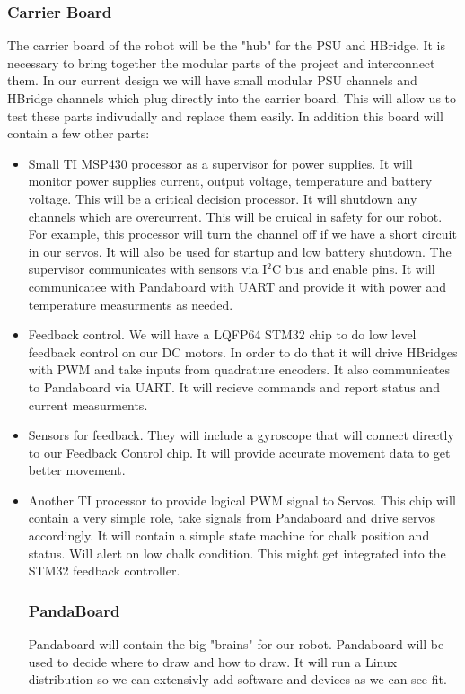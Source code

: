 \documentclass[12pt]{article}
\begin{document}
     \subsubsection{Carrier Board}
     The carrier board of the robot will be the "hub" for the PSU and HBridge. It is necessary to bring together the modular parts of the project and interconnect them. In our current design we will have small modular PSU channels and HBridge channels which plug directly into the carrier board. This will allow us to test these parts indivudally and replace them easily. In addition this board will contain a few other parts:
     \begin{itemize}
    \item Small TI MSP430 processor as a supervisor for power supplies. It will monitor power supplies current, output voltage, temperature and battery voltage. This will be a critical decision processor. It will shutdown any channels which are overcurrent. This will be cruical in safety for our robot. For example, this processor will turn the channel off if we have a short circuit in our servos. It will also be used for startup and low battery shutdown. The supervisor communicates with sensors via I$^{\textrm{2}}$C bus and enable pins. It will communicatee with Pandaboard with UART and provide it with power and temperature measurments as needed.
    \item Feedback control. We will have a LQFP64 STM32 chip to do low level feedback control on our DC motors. In order to do that it will drive HBridges with PWM and take inputs from quadrature encoders. It also communicates to Pandaboard via UART. It will recieve commands and report status and current measurments. 
    \item Sensors for feedback. They will include a gyroscope that will connect directly to our Feedback Control chip. It will provide accurate movement data to get better movement.
    \item Another TI processor to provide logical PWM signal to Servos. This chip will contain a very simple role, take signals from Pandaboard and drive servos accordingly. It will contain a simple state machine for chalk position and status. Will alert on low chalk condition. This might get integrated into the STM32 feedback controller.
     \subsubsection{PandaBoard}
     Pandaboard will contain the big "brains" for our robot. Pandaboard will be used to decide where to draw and how to draw. It will run a Linux distribution so we can extensivly add software and devices as we can see fit.

\end{itemize}
\end{document}
